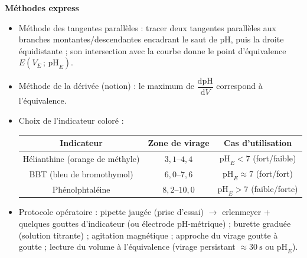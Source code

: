 \documentclass[11pt]{article}
\newcommand{\cle}[1]{{\popxbold\color{popdark}#1}}
\begin{document}
\begin{aretenir}
\textbf{Méthodes express}
\begin{itemize}
\item \cle{Méthode des tangentes parallèles} : tracer deux tangentes parallèles aux branches montantes/descendantes encadrant le saut de pH, puis la droite équidistante ; son intersection avec la courbe donne le point d'équivalence $E(V_E\,;\,\mathrm{pH}_E)$.
\item \cle{Méthode de la dérivée} (notion) : le maximum de $\dfrac{\mathrm{d}\mathrm{pH}}{\mathrm{d}V}$ correspond à l'équivalence.
\item \cle{Choix de l'indicateur coloré} :
  \begin{center}
  \begin{tabular}{|c|c|c|}\hline
  \rowcolor{popblueL} \textbf{Indicateur} & \textbf{Zone de virage} & \textbf{Cas d'utilisation} \\ \hline
  Hélianthine (orange de méthyle) & $3,1$--$4,4$ & $\mathrm{pH}_E < 7$ (fort/faible) \\ \hline
  BBT (bleu de bromothymol) & $6,0$--$7,6$ & $\mathrm{pH}_E \approx 7$ (fort/fort) \\ \hline
  Phénolphtaléine & $8,2$--$10,0$ & $\mathrm{pH}_E > 7$ (faible/forte) \\ \hline
  \end{tabular}
  \end{center}
\item \cle{Protocole opératoire} : pipette jaugée (prise d'essai) $\rightarrow$ erlenmeyer + quelques gouttes d'indicateur (ou électrode pH-métrique) ; burette graduée (solution titrante) ; agitation magnétique ; approche du virage goutte à goutte ; lecture du volume à l'équivalence (virage persistant $\approx \SI{30}{\second}$ ou $\mathrm{pH}_E$).
\end{itemize}
\end{aretenir}
\end{document}
